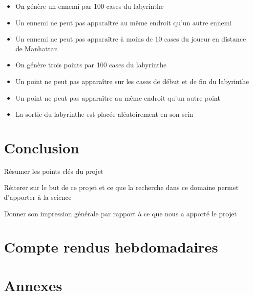 \documentclass[12pt]{scrreprt} %
\begin{document}
\begin{itemize}
    \item On génère un ennemi par 100 cases du labyrinthe
    \item Un ennemi ne peut pas apparaître au même endroit qu'un autre ennemi
    \item Un ennemi ne peut pas apparaître à moins de 10 cases du joueur en distance de Manhattan
    \item On génère trois points par 100 cases du labyrinthe
    \item Un point ne peut pas apparaître sur les cases de début et de fin du labyrinthe
    \item Un point ne peut pas apparaître au même endroit qu'un autre point
    \item La sortie du labyrinthe est placée aléatoirement en son sein
\end{itemize}


\chapter*{Conclusion}

Résumer les points clés du projet

Réiterer sur le but de ce projet et ce que la recherche dans ce domaine permet d'apporter à la science

Donner son impression générale par rapport à ce que nous a apporté le projet

\newpage %
\renewcommand{\bibname}{Bibliographie} %


\chapter*{Compte rendus hebdomadaires}

\chapter*{Annexes}
\end{document}
